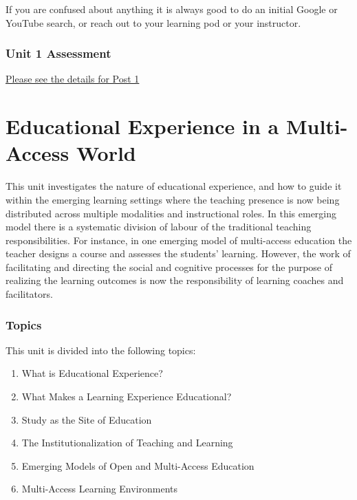 \documentclass[
]{book}
\providecommand{\tightlist}{%
  \setlength{\itemsep}{0pt}\setlength{\parskip}{0pt}}
\begin{document}
If you are confused about anything it is always good to do an initial Google or YouTube search, or reach out to your learning pod or your instructor.

\hypertarget{unit-1-assessment}{%
\subsection{Unit 1 Assessment}\label{unit-1-assessment}}

\href{https://ma-lead.github.io/ldrs663/assessments}{Please see the details for Post 1}

\hypertarget{educational-experience-in-a-multi-access-world}{%
\chapter{Educational Experience in a Multi-Access World}\label{educational-experience-in-a-multi-access-world}}

This unit investigates the nature of educational experience, and how to guide it within the emerging learning settings where the teaching presence is now being distributed across multiple modalities and instructional roles. In this emerging model there is a systematic division of labour of the traditional teaching responsibilities. For instance, in one emerging model of multi-access education the teacher designs a course and assesses the students' learning. However, the work of facilitating and directing the social and cognitive processes for the purpose of realizing the learning outcomes is now the responsibility of learning coaches and facilitators.

\hypertarget{topics-4}{%
\subsection*{Topics}\label{topics-4}}

This unit is divided into the following topics:

\begin{enumerate}
\def\labelenumi{\arabic{enumi}.}
\tightlist
\item
  What is Educational Experience?
\item
  What Makes a Learning Experience Educational?
\item
  Study as the Site of Education
\item
  The Institutionalization of Teaching and Learning
\item
  Emerging Models of Open and Multi-Access Education
\item
  Multi-Access Learning Environments
\end{enumerate}
\end{document}
